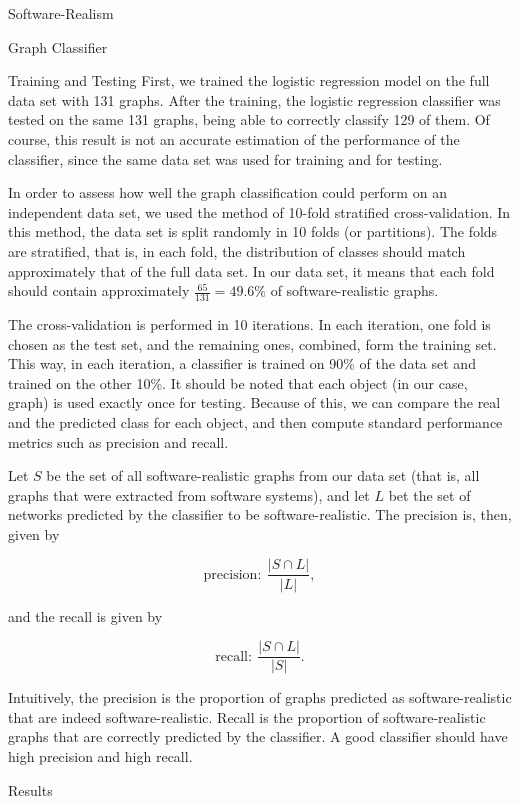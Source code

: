 \documentclass[11pt,twocolumn,a4paper,english]{article}
\begin{document}
\begin{section}{Software-Realism}
\begin{subsection}{Graph Classifier}
\begin{subsubsection}{Training and Testing}
	First, we trained the logistic regression model on the full data set with 131 graphs. After the training, the logistic regression classifier was tested on the same 131 graphs, being able to correctly classify 129 of them. Of course, this result is not an accurate estimation of the performance of the classifier, since the same data set was used for training and for testing.
	
	In order to assess how well the graph classification could perform on an independent data set, we used the method of 10-fold stratified cross-validation. In this method, the data set is split randomly in 10 folds (or partitions). The folds are stratified, that is, in each fold, the distribution of classes should match approximately that of the full data set. In our data set, it means that each fold should contain approximately $\frac{65}{131} = 49.6\%$ of software-realistic graphs. 
	
	The cross-validation is performed in 10 iterations. In each iteration, one fold is chosen as the test set, and the remaining ones, combined, form the training set. This way, in each iteration, a classifier is trained on 90\% of the data set and trained  on the other 10\%. It should be noted that each object (in our case, graph) is used exactly once for testing. Because of this, we can compare the real and the predicted class for each object, and then compute standard performance metrics such as precision and recall. 
	
	Let $S$ be the set of all software-realistic graphs from our data set (that is, all graphs that were extracted from software systems), and let $L$ bet the set of networks predicted by the classifier to be software-realistic. The precision is, then, given by
	
	$$
	\mathrm{precision}: ~\frac{|S \cap L|}{|L|},
	$$
	
	and the recall is given by
	
	$$
	\mathrm{recall}: ~\frac{|S \cap L|}{|S|}.
	$$
	
	Intuitively, the precision is the proportion of graphs predicted as software-realistic that are indeed software-realistic. Recall is the proportion of software-realistic graphs that are correctly predicted by the classifier. A good classifier should have high precision and high recall.
	
\end{subsubsection}

\begin{subsubsection}{Results}
	

\end{subsubsection}
\end{subsection}
\end{section}
\end{document}
